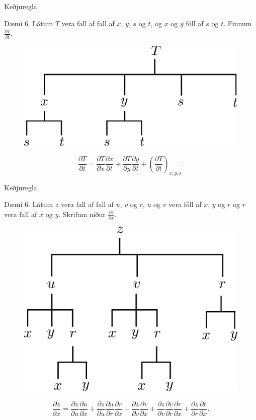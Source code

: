 \begin{frame}{Keðjuregla} 

\begin {block}{Dæmi 6.}
Látum $T$ vera fall af fall af $x$, $y$, $s$ og $t$, og $x$ og $y$ föll af $s$ og $t$. Finnum $\frac{ \partial T}{\partial t}$.
\end {block}
\begin{figure}[h!]
           \centering
            \includegraphics[width=0.45\linewidth]{chain6}
    \end{figure}
$$\frac{\partial T}{\partial t} = \frac{\partial T}{\partial x} \frac{\partial x}{\partial t} +\frac{\partial T}{\partial y} \frac{\partial y}{\partial t} + \left(\frac{\partial T}{\partial t}\right)_{x,y,s} .$$
\end{frame}

\begin{frame}{Keðjuregla} 

\begin {block}{Dæmi 6.}
Látum $z$ vera fall af fall af $u$, $v$ og $r$, $u$ og $v$ vera föll af $x$, $y$ og $r$ og $r$ vera fall af $x$ og $y$. Skrifum niður $\frac{\partial z}{\partial x}$.
\end {block}
\begin{figure}[h!]
           \centering
            \includegraphics[width=0.45\linewidth]{chain4}
    \end{figure}
$$\frac{\partial z}{\partial x} = \frac{\partial z}{\partial u} \frac{\partial u}{\partial x} +\frac{\partial z}{\partial u} \frac{\partial u}{\partial r} \frac{\partial r}{\partial x} 
+ \frac{\partial z}{\partial v} \frac{\partial v}{\partial x} + \frac{\partial z}{\partial v} \frac{\partial v}{\partial r} \frac{\partial r}{\partial x} +\frac{\partial z}{\partial r} \frac{\partial r}{\partial x}.$$
\end{frame}



